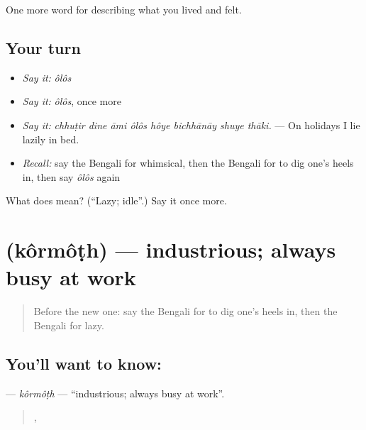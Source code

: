\begin{grammarlens}[title={What you've built}]
One more word for describing what you lived and felt.
\end{grammarlens}

\subsection*{Your turn}
\begin{itemize}
\raggedright
  \item \emph{Say it:} \emph{ôlôs}
  \item \emph{Say it:} \emph{ôlôs}, once more
  \item \emph{Say it:} \emph{chhuṭir dine āmi ôlôs hôye bichhānāy shuye thāki.} — On holidays I lie lazily in bed.
  \item \emph{Recall:} say the Bengali for whimsical, then the Bengali for to dig one's heels in, then say \emph{ôlôs} again
\end{itemize}

\begin{tcolorbox}[breakable,colback=teal!4,colframe=teal!35!black,title={Before you move on}]
What does  mean? (\textquotedblleft{}Lazy; idle\textquotedblright{}.) Say it once more.
\end{tcolorbox}
\section[\texorpdfstring{\bn{কর্মঠ} (kôrmôṭh)}{কর্মঠ (kôrmôṭh)}]{ (kôrmôṭh) — industrious; always busy at work}

\label{lesson:BN-C462-kormoth}



\begin{quote}
Before the new one: say the Bengali for to dig one's heels in, then the Bengali for lazy.
\end{quote}

\subsection*{You'll want to know: }
\textbf{} — \emph{kôrmôṭh} — \textquotedblleft{}industrious; always busy at work\textquotedblright{}.

\begin{quote}
   ,   
\end{quote}

